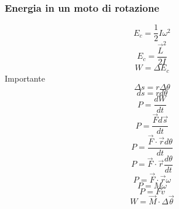\documentclass[twoside]{article}
\begin{document}
\subsubsection{Energia in un moto di rotazione}
\begin{equation}
  \boxed{E_c = \frac{1}{2} I \omega^2}
\end{equation}
\begin{equation}
  \boxed{E_c = \frac{\vec{L}^2}{2I}}
\end{equation}
\begin{equation}
  \boxed{W = \Delta E_c}
\end{equation}
Importante
\begin{equation*}
  \Delta s = r \Delta \theta
\end{equation*}
\begin{equation*}
  d s = r d \theta
\end{equation*}
\begin{equation*}
  P = \frac{dW}{dt}
\end{equation*}
\begin{equation*}
  P = \frac{\vec{F}d\vec{s}}{dt}
\end{equation*}
\begin{equation*}
  P = \frac{\vec{F} \cdot \vec{r}d \theta}{dt}
\end{equation*}
\begin{equation*}
  P = \vec{F} \cdot \vec{r} \frac{d \theta}{dt}
\end{equation*}
\begin{equation*}
  P = \vec{F} \cdot \vec{r} \omega
\end{equation*}
\begin{equation}
  \boxed{P = M \omega}
\end{equation}
\begin{equation}
  \boxed{P = F v}
\end{equation}
\begin{equation}
  \boxed{W = \vec{M} \cdot \Delta \vec{\theta}}
\end{equation}
\end{document}
